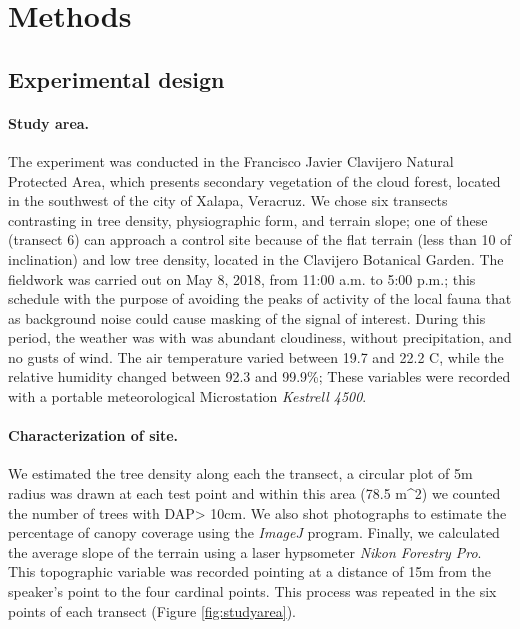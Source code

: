 \documentclass[fleqn,10pt,lineno]{wlpeerj} %
\begin{document}
\hypertarget{methods}{%
\section*{Methods}\label{methods}}

\hypertarget{experimental-design}{%
\subsection*{Experimental design}\label{experimental-design}}

\paragraph{Study area.}

The experiment was conducted in the Francisco Javier Clavijero Natural Protected Area, which presents secondary vegetation of the cloud forest, located in the southwest of the city of Xalapa, Veracruz. We chose six transects contrasting in tree density, physiographic form, and terrain slope; one of these (transect 6) can approach a control site because of the flat terrain (less than 10 of inclination) and low tree density, located in the Clavijero Botanical Garden. The fieldwork was carried out on May 8, 2018, from 11:00 a.m. to 5:00 p.m.; this schedule with the purpose of avoiding the peaks of activity of the local fauna that as background noise could cause masking of the signal of interest. During this period, the weather was with was abundant cloudiness, without precipitation, and no gusts of wind. The air temperature varied between 19.7 and 22.2 C, while the relative humidity changed between 92.3 and 99.9\%; These variables were recorded with a portable meteorological Microstation \emph{Kestrell 4500}.

\paragraph{Characterization of site.}

We estimated the tree density along each the transect, a circular plot of 5m radius was drawn at each test point and within this area (78.5 m\^{}2) we counted the number of trees with DAP\textgreater{} 10cm. We also shot photographs to estimate the percentage of canopy coverage using the \emph{ImageJ} program. Finally, we calculated the average slope of the terrain using a laser hypsometer \emph{Nikon Forestry Pro}. This topographic variable was recorded pointing at a distance of 15m from the speaker's point to the four cardinal points. This process was repeated in the six points of each transect (Figure \ref{fig:studyarea}).
\end{document}
